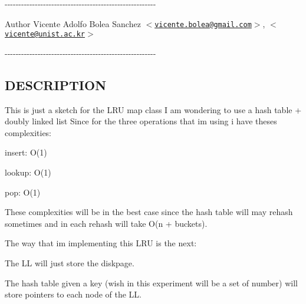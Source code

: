 -\/-\/-\/-\/-\/-\/-\/-\/-\/-\/-\/-\/-\/-\/-\/-\/-\/-\/-\/-\/-\/-\/-\/-\/-\/-\/-\/-\/-\/-\/-\/-\/-\/-\/-\/-\/-\/-\/-\/-\/-\/-\/-\/-\/-\/-\/-\/-\/-\/-\/-\/-\/-\/-\/-\/ \begin{DoxyAuthor}{\-Author}
\-Vicente \-Adolfo \-Bolea \-Sanchez $<$\href{mailto:vicente.bolea@gmail.com}{\tt vicente.\-bolea@gmail.\-com}$>$, $<$\href{mailto:vicente@unist.ac.kr}{\tt vicente@unist.\-ac.\-kr}$>$
\end{DoxyAuthor}
-\/-\/-\/-\/-\/-\/-\/-\/-\/-\/-\/-\/-\/-\/-\/-\/-\/-\/-\/-\/-\/-\/-\/-\/-\/-\/-\/-\/-\/-\/-\/-\/-\/-\/-\/-\/-\/-\/-\/-\/-\/-\/-\/-\/-\/-\/-\/-\/-\/-\/-\/-\/-\/-\/-\/\hypertarget{lru__map_8hh_DESCRIPTION}{}\subsection{\-D\-E\-S\-C\-R\-I\-P\-T\-I\-O\-N}\label{lru__map_8hh_DESCRIPTION}
\-This is just a sketch for the \-L\-R\-U map class \-I am wondering to use a hash table + doubly linked list \-Since for the three operations that im using i have theses complexities\-:


\begin{DoxyItemize}
\item insert\-: \-O(1)
\item lookup\-: \-O(1)
\item pop\-: \-O(1)
\end{DoxyItemize}

\-These complexities will be in the best case since the hash table will may rehash sometimes and in each rehash will take \-O(n + buckets).

\-The way that im implementing this \-L\-R\-U is the next\-:


\begin{DoxyItemize}
\item \-The \-L\-L will just store the diskpage.
\end{DoxyItemize}


\begin{DoxyItemize}
\item \-The hash table given a key (wish in this experiment will be a set of number) will store pointers to each node of the \-L\-L. 
\end{DoxyItemize}